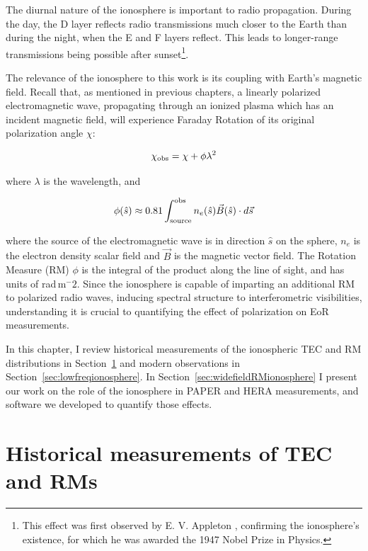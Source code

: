 The diurnal nature of the ionosphere is important to radio propagation. During the day, the D layer reflects radio transmissions much closer to the Earth than during the night, when the E and F layers reflect. This leads to longer-range transmissions being possible after sunset\footnote{This effect was first observed by E. V. Appleton \citep{Appleton.46}, confirming the ionosphere's existence, for which he was awarded the 1947 Nobel Prize in Physics.}.

The relevance of the ionosphere to this work is its coupling with Earth's magnetic field. Recall that, as mentioned in previous chapters, a linearly polarized electromagnetic wave, propagating through an ionized plasma which has an incident magnetic field, will experience Faraday Rotation of its original polarization angle $\chi$:

\begin{equation}
\chi_{\rm obs} = \chi + \phi\lambda^2
\end{equation}

where $\lambda$ is the wavelength, and

\begin{equation}
\phi(\hat{s}) \approx 0.81 \int^{\rm obs}_{\rm source} n_e(\hat{s}) \vec{B}(\hat{s}) \cdot d\vec{s}
\label{eq:ionopshere_rm}
\end{equation}

where the source of the electromagnetic wave is in direction $\hat{s}$ on the sphere, $n_e$ is the electron density scalar field and $\vec{B}$ is the magnetic vector field. The Rotation Measure (RM) $\phi$ is the integral of the product along the line of sight, and has units of rad\,m$^-2$. Since the ionosphere is capable of imparting an additional RM to polarized radio waves, inducing spectral structure to interferometric visibilities, understanding it is crucial to quantifying the effect of polarization on EoR measurements.

In this chapter, I review historical measurements of the ionospheric TEC and RM distributions in Section~\ref{sec:historicalTEC} and modern observations in Section~\ref{sec:lowfreqionosphere}. In Section~\ref{sec:widefieldRMionosphere} I present our work on the role of the ionosphere in PAPER and HERA measurements, and software we developed to quantify those effects.

\section{Historical measurements of TEC and RMs}
\label{sec:historicalTEC}

